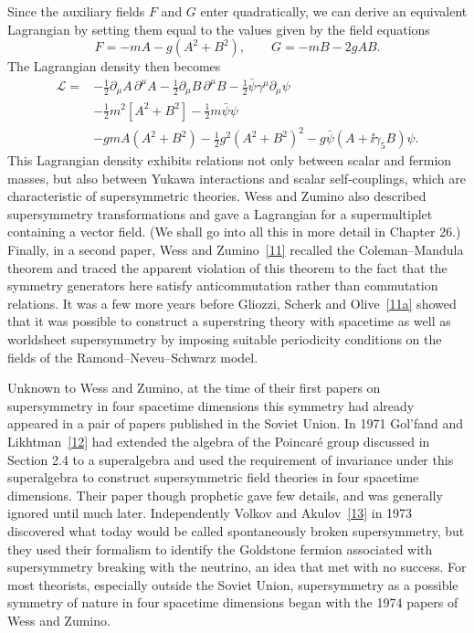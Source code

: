 Since the auxiliary fields \(F\) and \(G\) enter quadratically, we can derive
an equivalent Lagrangian by setting them equal to the values given by the
field equations
\begin{equation}
F=-mA-g(A^2+B^2),
\qquad
G=-mB-2gAB.
\tag{24.2.10}\label{eq:24.2.10}
\end{equation}
The Lagrangian density then becomes
\begin{equation}
\begin{aligned}
\mathcal L={}&
-\frac12\partial_\mu A\,\partial^\mu A
-\frac12\partial_\mu B\,\partial^\mu B
-\frac12\bar\psi\gamma^\mu\partial_\mu\psi
\\
&-\frac12m^2\left[A^2+B^2\right]-\frac12m\bar\psi\psi
\\
&-gmA(A^2+B^2)-\frac12g^2(A^2+B^2)^2
-g\bar\psi(A+\ii\gamma_5B)\psi.
\end{aligned}
\tag{24.2.11}\label{eq:24.2.11}
\end{equation}
This Lagrangian density exhibits relations not only between scalar and
fermion masses, but also between Yukawa interactions and scalar
self-couplings, which are characteristic of supersymmetric theories. Wess and
Zumino also described supersymmetry transformations and gave a Lagrangian for
a supermultiplet containing a vector field. (We shall go into all this in more
detail in Chapter 26.) Finally, in a second paper, Wess and
Zumino~\hyperref[ch24-ref-11]{[11]} recalled the Coleman--Mandula theorem and
traced the apparent violation of this theorem to the fact that the symmetry
generators here satisfy anticommutation rather than commutation relations. It
was a few more years before Gliozzi, Scherk and
Olive~\hyperref[ch24-ref-11a]{[11a]} showed that it was possible to construct
a superstring theory with spacetime as well as worldsheet supersymmetry by
imposing suitable periodicity conditions on the fields of the
Ramond--Neveu--Schwarz model.

Unknown to Wess and Zumino, at the time of their first papers on supersymmetry
in four spacetime dimensions this symmetry had already appeared in a pair of
papers published in the Soviet Union. In 1971 Gol'fand and
Likhtman~\hyperref[ch24-ref-12]{[12]} had extended the algebra of the Poincaré
group discussed in Section 2.4 to a superalgebra and used the requirement of
invariance under this superalgebra to construct supersymmetric field theories
in four spacetime dimensions. Their paper though prophetic gave few details,
and was generally ignored until much later. Independently Volkov and
Akulov~\hyperref[ch24-ref-13]{[13]} in 1973 discovered what today would be
called spontaneously broken supersymmetry, but they used their formalism to
identify the Goldstone fermion associated with supersymmetry breaking with
the neutrino, an idea that met with no success. For most theorists, especially
outside the Soviet Union, supersymmetry as a possible symmetry of nature in
four spacetime dimensions began with the 1974 papers of Wess and Zumino.
